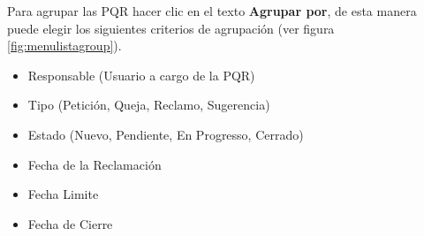 Para agrupar las PQR hacer clic en el texto \textbf{Agrupar por}, de esta manera puede elegir los siguientes
criterios de agrupación (ver figura \ref{fig:menulistagroup}).
\begin{itemize}
 \item Responsable (Usuario a cargo de la PQR)
 \item Tipo (Petición, Queja, Reclamo, Sugerencia)
 \item Estado (Nuevo, Pendiente, En Progresso, Cerrado)
 \item Fecha de la Reclamación
 \item Fecha Limite
 \item Fecha de Cierre
\end{itemize}

